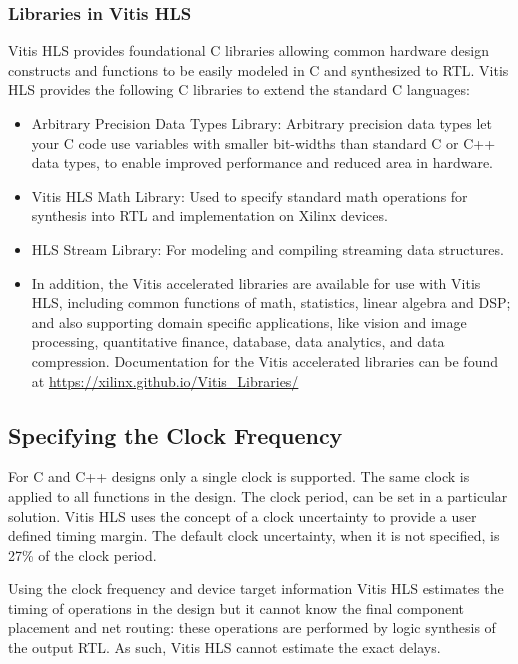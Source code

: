 \subsubsection{Libraries in Vitis HLS}
Vitis HLS provides foundational C libraries allowing common hardware design constructs and functions to be easily modeled in C and synthesized to RTL. Vitis HLS provides the following C libraries to extend the standard C languages:

\begin{itemize}
  \item Arbitrary Precision Data Types Library: Arbitrary precision data types let your C code use variables with smaller bit-widths than standard C or C++ data types, to enable improved performance and reduced area in hardware.
  \item Vitis HLS Math Library: Used to specify standard math operations for synthesis into RTL and implementation on Xilinx devices.
  \item HLS Stream Library: For modeling and compiling streaming data structures.
  \item In addition, the Vitis accelerated libraries are available for use with Vitis HLS, including common functions of math, statistics, linear algebra and DSP; and also supporting domain specific applications, like vision and image processing, quantitative finance, database, data analytics, and data compression. Documentation for the Vitis accelerated libraries can be found at \url{https://xilinx.github.io/Vitis_Libraries/}
\end{itemize}

\subsection{Specifying the Clock Frequency}
For C and C++ designs only a single clock is supported. The same clock is applied to all functions in the design. The clock period, can be set in a particular solution. Vitis HLS uses the concept of a clock uncertainty to provide a user defined timing margin. The default clock uncertainty, when it is not specified, is 27\% of the clock period.

\par Using the clock frequency and device target information Vitis HLS estimates the timing of operations in the design but it cannot know the final component placement and net routing:
these operations are performed by logic synthesis of the output RTL. As such, Vitis HLS cannot estimate the exact delays.

